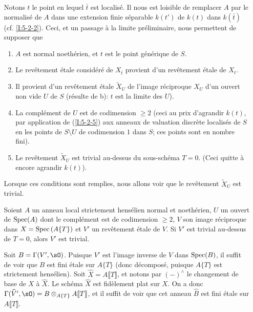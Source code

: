 Notons $t$ le point en lequel $\bar t$ est localisé. Il nous est loisible de 
remplacer $A$ par le normalisé de $A$ dans une extension finie séparable 
$k(t')$ de $k(t)$ dans $k(\bar t)$ (cf. \ref{I:5-2-2}). Ceci, et un passage à 
la limite préliminaire, nous permettent de supposer que 
\begin{enumerate}[\indent a)]
  \item $A$ est normal noethérien, et $t$ est le point générique de $S$.
  \item Le revêtement étale considéré de $X_{\bar t}$ provient d'un 
    revêtement étale de $X_t$. 
  \item Il provient d'un revêtement étale $\widetilde X_U$ de l'image 
    réciproque $X_U$ d'un ouvert non vide $U$ de $S$ (résulte de b): $t$ 
    est la limite des $U$).
  \item La complément de $U$ est de codimension $\geqslant 2$ (ceci au prix 
    d'agrandir $k(t)$, par application de (\ref{I:5-2-5}) aux anneaux de 
    valuation discrète localisés de $S$ en les points de $S\setminus U$ de 
    codimension $1$ dans $S$; ces points sont en nombre fini). 
  \item Le revêtement $\widetilde X_U$ est trivial au-dessus du sous-schéma 
    $T=0$. (Ceci quitte à encore agrandir $k(t)$). 
\end{enumerate}

Lorsque ces conditions sont remplies, nous allons voir que le revêtement 
$\widetilde X_U$ est trivial. 





\begin{lemma}\label{I:5-2-7} %
Soient $A$ un anneau local strictement hensélien normal et noethérien, $U$ 
un ouvert de $\operatorname{Spec}(A)$ dont le complément est de codimension $\geqslant 2$, 
$V$ son image réciproque dans $X=\operatorname{Spec}\left(A\{T\}\right)$ et $V'$ un 
revêtement étale de $V$. Si $V'$ est trivial au-dessus de $T=0$, alors $V'$ 
est trivial. 
\end{lemma}

Soit $B=\Gamma(V',\sO)$. Puisque $V'$ est l'image inverse de $V$ dans 
$\operatorname{Spec}(B)$, il suffit de voir que $B$ est fini étale sur $A\{T\}$ (donc 
décomposé, puisque $A\{T\}$ est strictement hensélien). Soit 
$\widehat X=A\llbracket T\rrbracket$, et notons par $(-)^\wedge$ le changement 
de base de $X$ à $\widehat X$. Le schéma $\widehat X$ est fidèlement plat 
sur $X$. On a donc 
$\Gamma(\widehat V',\sO) = B\otimes_{A\{T\}} A\llbracket T\rrbracket$, et il 
suffit de voir que cet anneau $\widehat B$ est fini étale sur 
$A\llbracket T\rrbracket$. 

